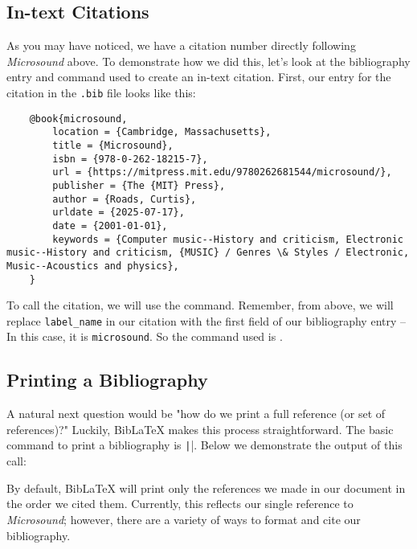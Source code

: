 \documentclass{article}
\begin{document}
\subsection{In-text Citations}

As you may have noticed, we have a citation number directly following \textit{Microsound} above. To demonstrate how we did this, let's look at the bibliography entry and command used to create an in-text citation. First, our entry for the citation in the \texttt{.bib} file looks like this:
    \begin{verbatim}
    @book{microsound,
    	location = {Cambridge, Massachusetts},
    	title = {Microsound},
    	isbn = {978-0-262-18215-7},
    	url = {https://mitpress.mit.edu/9780262681544/microsound/},
    	publisher = {The {MIT} Press},
    	author = {Roads, Curtis},
    	urldate = {2025-07-17},
    	date = {2001-01-01},
    	keywords = {Computer music--History and criticism, Electronic music--History and criticism, {MUSIC} / Genres \& Styles / Electronic, Music--Acoustics and physics},
    }
    \end{verbatim}

To call the citation, we will use the \texttt{\cite{label_name}} command. Remember, from above, we will replace \texttt{label\_name} in our citation with the first field of our bibliography entry -- In this case, it is \texttt{microsound}. So the command used is \texttt{\cite{microsound}}.

\subsection{Printing a Bibliography}
A natural next question would be "how do we print a full reference (or set of references)?" Luckily, BibLaTeX makes this process straightforward. The basic command to print a bibliography is \texttt|\printbibliography|. Below we demonstrate the output of this call:

\printbibliography[segment=1]

\newrefsegment
By default, BibLaTeX will print only the references we made in our document in the order we cited them. Currently, this reflects our single reference to \textit{Microsound}; however, there are a variety of ways to format and cite our bibliography.
\end{document}
